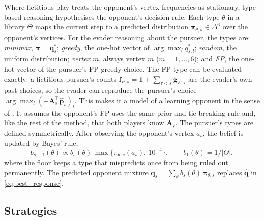 \documentclass[letterpaper, 10 pt, conference]{ieeeconf}  %
\begin{document}
Where fictitious play treats the opponent's vertex frequencies as stationary, type-based reasoning hypothesises the opponent's decision rule. Each type $\theta$ in a library $\Theta$ maps the current step to a predicted distribution $\boldsymbol{\pi}_{\theta,s} \in \Delta^6$ over the opponent's vertices. For the evader reasoning about the pursuer, the types are: \emph{minimax}, $\boldsymbol{\pi} = \mathbf{q}^*_s$; \emph{greedy}, the one-hot vector of $\arg\max_l q^*_{s,l}$; \emph{random}, the uniform distribution; \emph{vertex} $m$, always vertex $m$ ($m = 1, \dots, 6$); and \emph{FP}, the one-hot vector of the pursuer's FP-greedy choice. The FP type can be evaluated exactly: a fictitious pursuer's counts $\mathbf{f}_{P,s} = \mathbf{1} + \sum_{\tau < s} \mathbf{g}_{E,\tau}$ are the evader's own past choices, so the evader can reproduce the pursuer's choice $\arg\max_l (-\mathbf{A}_s^\top \hat{\mathbf{p}}_s)_l$. This makes it a model of a learning opponent in the sense of \cite{camerer2002sophisticated}. It assumes the opponent's FP uses the same prior and tie-breaking rule and, like the rest of the method, that both players know $\mathbf{A}_s$. The pursuer's types are defined symmetrically. After observing the opponent's vertex $a_s$, the belief is updated by Bayes' rule,
%
\begin{equation}
    b_{s+1}(\theta) \propto b_s(\theta)\, \max\{\pi_{\theta,s}(a_s),\, 10^{-4}\}, \qquad b_1(\theta) = 1/|\Theta|,
    \label{eq:type_posterior}
\end{equation}
%
where the floor keeps a type that mispredicts once from being ruled out permanently. The predicted opponent mixture $\tilde{\mathbf{q}}_s = \sum_{\theta} b_s(\theta)\, \boldsymbol{\pi}_{\theta,s}$ replaces $\hat{\mathbf{q}}$ in \eqref{eq:best_response}.


\subsection{Strategies}
\label{sec:strategies}
\end{document}
